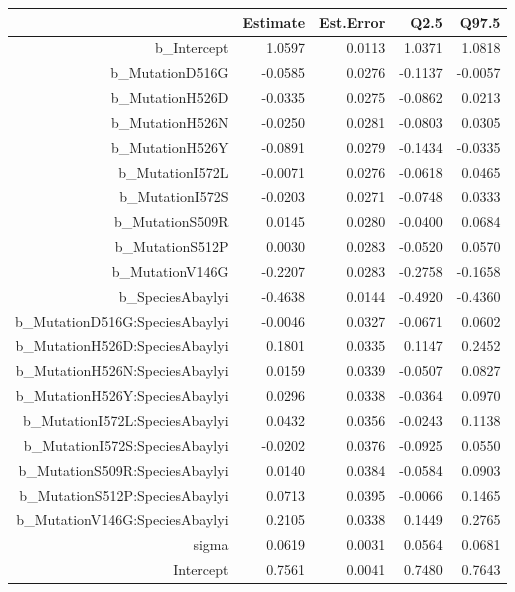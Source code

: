 \begin{table}[ht]
\centering
\begin{tabular}{rrrrr}
  \hline
 & Estimate & Est.Error & Q2.5 & Q97.5 \\ 
  \hline
b\_Intercept & 1.0597 & 0.0113 & 1.0371 & 1.0818 \\ 
  b\_MutationD516G & -0.0585 & 0.0276 & -0.1137 & -0.0057 \\ 
  b\_MutationH526D & -0.0335 & 0.0275 & -0.0862 & 0.0213 \\ 
  b\_MutationH526N & -0.0250 & 0.0281 & -0.0803 & 0.0305 \\ 
  b\_MutationH526Y & -0.0891 & 0.0279 & -0.1434 & -0.0335 \\ 
  b\_MutationI572L & -0.0071 & 0.0276 & -0.0618 & 0.0465 \\ 
  b\_MutationI572S & -0.0203 & 0.0271 & -0.0748 & 0.0333 \\ 
  b\_MutationS509R & 0.0145 & 0.0280 & -0.0400 & 0.0684 \\ 
  b\_MutationS512P & 0.0030 & 0.0283 & -0.0520 & 0.0570 \\ 
  b\_MutationV146G & -0.2207 & 0.0283 & -0.2758 & -0.1658 \\ 
  b\_SpeciesAbaylyi & -0.4638 & 0.0144 & -0.4920 & -0.4360 \\ 
  b\_MutationD516G:SpeciesAbaylyi & -0.0046 & 0.0327 & -0.0671 & 0.0602 \\ 
  b\_MutationH526D:SpeciesAbaylyi & 0.1801 & 0.0335 & 0.1147 & 0.2452 \\ 
  b\_MutationH526N:SpeciesAbaylyi & 0.0159 & 0.0339 & -0.0507 & 0.0827 \\ 
  b\_MutationH526Y:SpeciesAbaylyi & 0.0296 & 0.0338 & -0.0364 & 0.0970 \\ 
  b\_MutationI572L:SpeciesAbaylyi & 0.0432 & 0.0356 & -0.0243 & 0.1138 \\ 
  b\_MutationI572S:SpeciesAbaylyi & -0.0202 & 0.0376 & -0.0925 & 0.0550 \\ 
  b\_MutationS509R:SpeciesAbaylyi & 0.0140 & 0.0384 & -0.0584 & 0.0903 \\ 
  b\_MutationS512P:SpeciesAbaylyi & 0.0713 & 0.0395 & -0.0066 & 0.1465 \\ 
  b\_MutationV146G:SpeciesAbaylyi & 0.2105 & 0.0338 & 0.1449 & 0.2765 \\ 
  sigma & 0.0619 & 0.0031 & 0.0564 & 0.0681 \\ 
  Intercept & 0.7561 & 0.0041 & 0.7480 & 0.7643 \\ 

\end{tabular}
\end{table}
